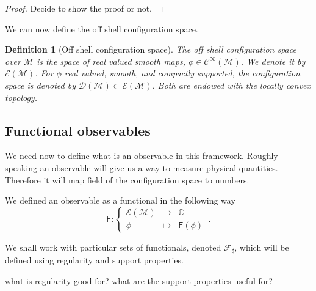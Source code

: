 \documentclass[10pt]{book}
\newcommand{\Ccal}{\mathcal{C}}
\newcommand{\Dcal}{\mathcal{D}}
\newcommand{\Ecal}{\mathcal{E}}
\newcommand{\Fcal}{\mathcal{F}}
\newcommand{\Mcal}{\mathcal{M}}
\newcommand{\Cbb}{\mathbb{C}}
\newcommand{\Fsf}{\mathsf{F}}
\theoremstyle{break}
\newtheorem{definition}{Definition}
\newtheorem{proof}{Proof}
\begin{document}
\begin{proof}
Decide to show the proof or not.
\end{proof}

We can now define the off shell configuration space.


\begin{definition}[Off shell configuration space]
The off shell configuration space over $\Mcal$ is the space of real valued smooth maps, $\phi \in \Ccal^\infty(\Mcal)$. We denote it by $\Ecal(\Mcal)$. For $\phi$ real valued, smooth, and compactly supported, the configuration space is denoted by $\Dcal(\Mcal) \subset \Ecal(\Mcal)$. Both are endowed with the locally convex topology.
\end{definition}


\subsection{Functional observables}


We need now to define what is an observable in this framework. Roughly speaking an observable will give us a way to measure physical quantities. Therefore it will map field of the configuration space to numbers.


\bigskip


We defined an observable as a functional in the following way
%
\begin{equation*}
\Fsf : \left\{
\begin{array}{ccc}
\Ecal(\Mcal) & \to     & \Cbb \\
\phi  & \mapsto & \Fsf(\phi)
\end{array}
\right. \ .
\end{equation*}


\newpage
%
We shall work with particular sets of functionals, denoted $\Fcal_\sharp$, which will be defined using regularity and support properties. \par%


what is regularity good for?  what are the support properties useful for? 


\bigskip
\end{document}
